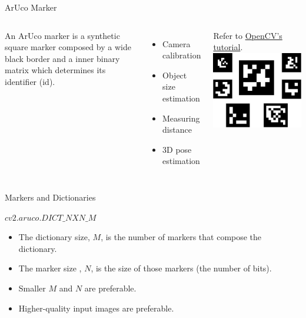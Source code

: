 \documentclass[12pt,letterpaper]{beamer}
\begin{document}
\begin{frame}{ArUco Marker}
    \begin{columns}
        An ArUco marker is a synthetic square marker composed by a wide black border and a inner binary matrix which determines its identifier (id). 
        {\scriptsize
            \begin{itemize}
                \item Camera calibration
                \item Object size estimation
                \item Measuring distance
                \item 3D pose estimation
            \end{itemize}
        }
        Refer to \href{https://docs.opencv.org/4.5.2/d5/dae/tutorial_aruco_detection.html}{OpenCV's tutorial}.
        \includegraphics[width=0.8\linewidth]{aruco_markers}
    \end{columns}
\end{frame}

\begin{frame}{Markers and Dictionaries}

    $cv2.aruco.DICT\_NXN\_M$
    {\scriptsize
        \begin{itemize}
            \item The dictionary size, $M$, is the number of markers that compose the dictionary. 
            \item The marker size , $N$, is the size of those markers (the number of bits).
            \item Smaller $M$ and $N$ are preferable.
            \item Higher-quality input images are preferable.
        \end{itemize}
    }

\end{frame}
\end{document}
